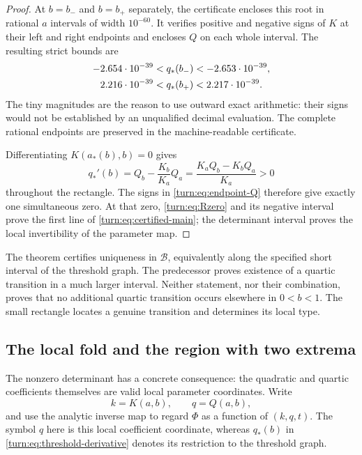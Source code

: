 \begin{proof}
At $b=b_-$ and $b=b_+$ separately, the certificate encloses this root
in rational $a$ intervals of width $10^{-60}$.  It verifies positive
and negative signs of $K$ at their left and right endpoints and
encloses $Q$ on each whole interval.  The resulting strict bounds are
\begin{align}
 -2.654\cdot10^{-39}&<q_*(b_-)<-2.653\cdot10^{-39},\notag\\
  2.216\cdot10^{-39}&<q_*(b_+)< 2.217\cdot10^{-39}.
 \label{turn:eq:endpoint-Q}
\end{align}
The tiny magnitudes are the reason to use outward exact arithmetic:
their signs would not be established by an unqualified decimal
evaluation.  The complete rational endpoints are preserved in the
machine-readable certificate.

Differentiating $K(a_*(b),b)=0$ gives
\begin{equation}
 q_*'(b)=Q_b-\frac{K_b}{K_a}Q_a
        =\frac{K_aQ_b-K_bQ_a}{K_a}>0
 \label{turn:eq:threshold-derivative}
\end{equation}
throughout the rectangle.  The signs in \eqref{turn:eq:endpoint-Q}
therefore give exactly one simultaneous zero.  At that zero,
\eqref{turn:eq:Rzero} and its negative interval prove the first line of
\eqref{turn:eq:certified-main}; the determinant interval proves the
local invertibility of the parameter map.
\end{proof}

\begin{remark}
\label{turn:rem:local-unique}
The theorem certifies uniqueness in $\mathcal B$, equivalently along
the specified short interval of the threshold graph.  The predecessor
proves existence of a quartic transition in a much larger interval.
Neither statement, nor their combination, proves that no additional
quartic transition occurs elsewhere in $0<b<1$.  The small rectangle
locates a genuine transition and determines its local type.
\end{remark}

\subsection{The local fold and the region with two extrema}
\label{turn:sec:fold}

The nonzero determinant has a concrete consequence: the quadratic and
quartic coefficients themselves are valid local parameter coordinates.
Write
\[
 k=K(a,b),\qquad q=Q(a,b),
\]
and use the analytic inverse map to regard $\Phi$ as a function of
$(k,q,t)$.  The symbol $q$ here is this local coefficient coordinate,
whereas $q_*(b)$ in \eqref{turn:eq:threshold-derivative} denotes its
restriction to the threshold graph.

